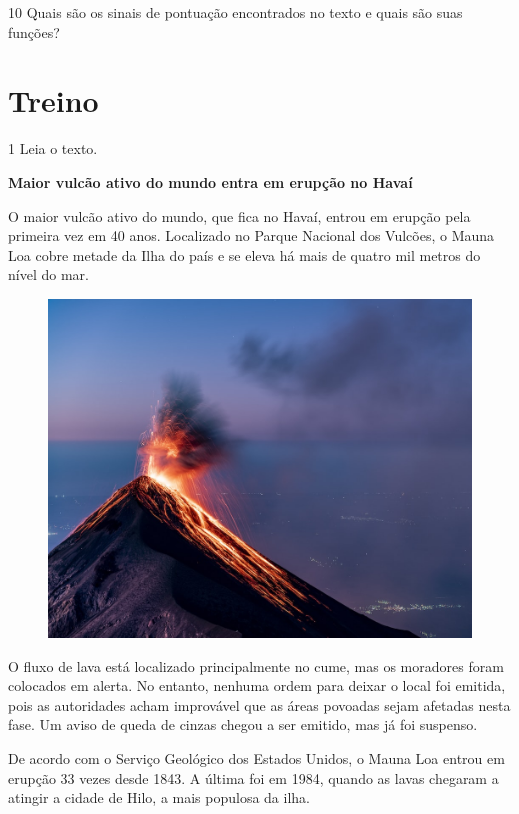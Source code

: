 
\pagebreak
\num{10} Quais são os sinais de pontuação encontrados no texto e quais são
suas funções?



\section*{Treino}

\num{1} Leia o texto.

\begin{myquote}
\textbf{Maior vulcão ativo do mundo entra em erupção no Havaí}

O maior vulcão ativo do mundo, que fica no Havaí, entrou em erupção pela primeira vez em 40 anos. Localizado no Parque Nacional dos Vulcões, o Mauna Loa cobre metade da Ilha do país e se eleva há mais de quatro mil metros do nível do mar.

\begin{figure}
\includegraphics[width=.5\textwidth]{./imgs/img9.jpg}
\end{figure}

O fluxo de lava está localizado principalmente no cume, mas os moradores foram colocados em alerta. No entanto, nenhuma ordem para deixar o local foi emitida, pois as autoridades acham improvável que as áreas povoadas sejam afetadas nesta fase. Um aviso de queda de cinzas chegou a ser emitido, mas já foi suspenso.

De acordo com o Serviço Geológico dos Estados Unidos, o Mauna Loa entrou em erupção 33 vezes desde 1843. A última foi em 1984, quando as lavas chegaram a atingir a cidade de Hilo, a mais populosa da ilha.

\end{myquote}

